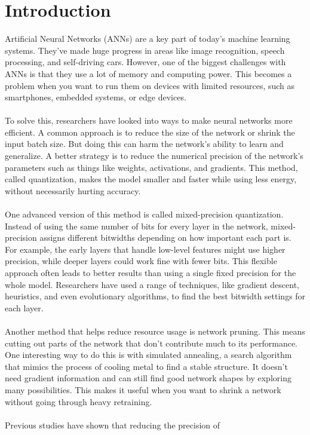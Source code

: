 \documentclass[11pt]{article}
\begin{document}
\section{Introduction}
Artificial Neural Networks (ANNs) are a key part of today’s machine learning
systems. They’ve made huge progress in areas like image recognition, speech
processing, and self-driving cars. However, one of the biggest challenges with
ANNs is that they use a lot of memory and computing power. This becomes a
problem when you want to run them on devices with limited resources, such as
smartphones, embedded systems, or edge devices. \\ \\ To solve this,
researchers have looked into ways to make neural networks more efficient. A
common approach is to reduce the size of the network or shrink the input batch
size. But doing this can harm the network’s ability to learn and generalize. A
better strategy is to reduce the numerical precision of the network’s
parameters such as things like weights, activations, and gradients. This
method, called quantization, makes the model smaller and faster while using
less energy, without necessarily hurting accuracy. \\ \\ One advanced version
of this method is called mixed-precision quantization. Instead of using the
same number of bits for every layer in the network, mixed-precision assigns
different bitwidths depending on how important each part is. For example, the
early layers that handle low-level features might use higher precision, while
deeper layers could work fine with fewer bits. This flexible approach often
leads to better results than using a single fixed precision for the whole
model. Researchers have used a range of techniques, like gradient descent,
heuristics, and even evolutionary algorithms, to find the best bitwidth
settings for each layer. \\ \\ Another method that helps reduce resource usage
is network pruning. This means cutting out parts of the network that don’t
contribute much to its performance. One interesting way to do this is with
simulated annealing, a search algorithm that mimics the process of cooling
metal to find a stable structure. It doesn’t need gradient information and can
still find good network shapes by exploring many possibilities. This makes it
useful when you want to shrink a network without going through heavy
retraining. \\ \\ Previous studies have shown that reducing the precision of
\end{document}
